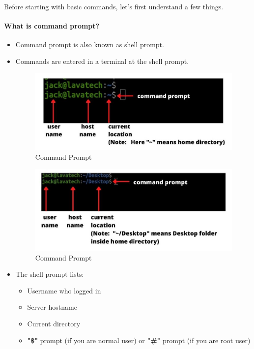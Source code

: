 

\begin{flushleft}
	Before starting with basic commands, let's first understand a few things.
	\paragraph{What is command prompt?}
	\begin{itemize}
		\item Command prompt is also known as shell prompt.
		\item Commands are entered in a terminal at the shell prompt. 
		\begin{figure}[h!]
			\centering
			\includegraphics[scale=.5]{content/chapter2/images/command_prompt1.jpg}
			\caption{Command Prompt}
			\label{fig:command_prompt1}
		\end{figure}
		\begin{figure}[h!]
			\centering
			\includegraphics[scale=.5]{content/chapter2/images/command_prompt2.jpg}
			\caption{Command Prompt}
			\label{fig:command_prompt2}
		\end{figure}
		\item The shell prompt lists:
		\begin{itemize}
			\item Username who logged in
			\item Server hostname
			\item Current directory 
			\item \textbf{"\$"} prompt (if you are normal user) or \textbf{"\#"} prompt (if you are root user)
		\end{itemize}		
	


\end{itemize}
\end{flushleft}
